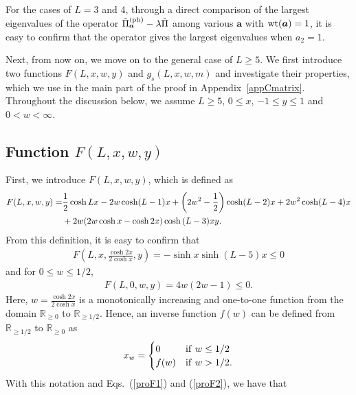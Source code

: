 \documentclass[prl,twocolumn,superscriptaddress,nofootinbib]{revtex4}
\def\U#1{{\rm #1}}
\begin{document}
\begin{widetext}
    For the cases of $L=3$ and 4, 
    through a direct comparison of the largest eigenvalues of the operator $\hat{\Pi}^{\U{(ph)}}_{\bm{a}}-\lambda\hat{\Pi}$
    among various $\bm{a}$ with $\U{wt}(\bm{a})=1$, it is easy to confirm that the operator gives the largest eigenvalues 
    when $a_2=1$. 
    
    Next, from now on, we move on to the general case of $L\geq5$.
    We first introduce two functions $F(L,x,w,y)$ and $g_s(L,x,w,m)$ and investigate their properties,
    which we use in the main part of the proof in Appendix~\ref{appCmatrix}. 
    Throughout the discussion below, we assume $L\geq5$, $0\leq x$, $-1\leq y\leq 1$ and $0<w<\infty$. 
    
    \subsection{Function $F(L,x,w,y)$}
    First, we introduce $F(L,x,w,y)$, which is defined as
    \begin{align}
  F(L,x,w,y)=&\frac{1}{2}\cosh{Lx}-2w\cosh(L-1)x+\left(2w^2-\frac{1}{2}\right)\cosh(L-2)x+2w^2\cosh(L-4)x\notag\\
  &+2w(2w\cosh{x}-\cosh{2x})\cosh{(L-3)xy}.
  \label{funcF}
    \end{align}
From this definition, it is easy to confirm that 
    \begin{align}
      F\left(L,x,\frac{\cosh{2x}}{2\cosh{x}},y\right)=-\sinh x\sinh(L-5)x\leq0
      \label{proF1}
  \end{align}
    and for $0\leq w\leq 1/2$, 
        \begin{align}
          F(L,0,w,y)=4w(2w-1)\leq0.
                  \label{proF2}
        \end{align}
        Here, $w=\frac{\cosh{2x}}{2\cosh{x}}$ is a monotonically increasing and one-to-one function
        from the domain $\mathbb{R}_{\geq 0}$ to $\mathbb{R}_{\geq 1/2}$.
        Hence, an inverse function $f(w)$ can be defined from $\mathbb{R}_{\geq 1/2}$ to $\mathbb{R}_{\geq 0}$ as
        \begin{align}
          x_w=
          \begin{cases}
            0&\U{if}~w\leq 1/2\\
            f(w)&\U{if}~w> 1/2. 
            \end{cases}
            \end{align}
With this notation and Eqs.~(\ref{proF1}) and (\ref{proF2}), we have that
        \begin{align}

\end{align}
\end{widetext}
\end{document}
